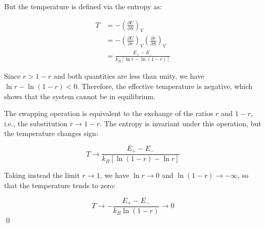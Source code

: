 \documentclass[12pt]{article}
\begin{document}
But the temperature is defined via the entropy as:

\begin{equation}
    \begin{split}
        T &= -\left( \frac{\partial U}{\partial S} \right)_{V} \\
        &= -\left( \frac{\partial U}{\partial r} \right)_{V} \left( \frac{\partial r}{\partial S} \right)_{V} \\
        &= \frac{E_{+} - E_{-}}{k_{B} [\ln{r} - \ln{(1-r)}]}
    \end{split}
\end{equation}

Since $r > 1 - r$ and both quantities are less than unity, we have $\ln{r} - \ln{(1-r)} < 0$. Therefore, the effective temperature is negative, which shows that the system cannot be in equilibrium.

The swapping operation is equivalent to the exchange of the ratios $r$ and $1-r$, i.e., the substitution $r \to 1-r$. The entropy is invariant under this operation, but the temperature changes sign:

\begin{equation}
    T \to \frac{E_{+} - E_{-}}{k_{B} [\ln{(1-r)} - \ln{r}]}
\end{equation}

Taking instead the limit $r \to 1$, we have $\ln{r} \to 0$ and $\ln{(1-r)} \to -\infty$, so that the temperature tends to zero:

\begin{equation}
    T \to -\frac{E_{+} - E_{-}}{k_{B} \ln{(1-r)}} \to 0
\end{equation}
\qed
\end{document}
